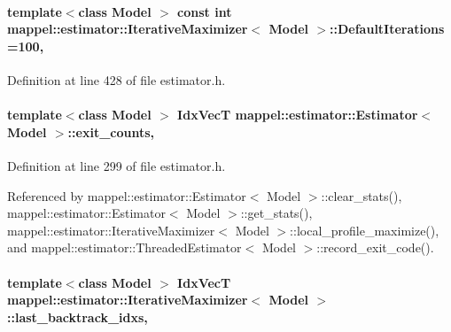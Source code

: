 \paragraph[{\texorpdfstring{Default\+Iterations}{DefaultIterations}}]{\setlength{\rightskip}{0pt plus 5cm}template$<$class Model $>$ const int {\bf mappel\+::estimator\+::\+Iterative\+Maximizer}$<$ Model $>$\+::Default\+Iterations =100\hspace{0.3cm}{\ttfamily [static]}, {\ttfamily [inherited]}}\hypertarget{classmappel_1_1estimator_1_1IterativeMaximizer_ab66c01c2eee630f3fca119f3fe09a19a}{}\label{classmappel_1_1estimator_1_1IterativeMaximizer_ab66c01c2eee630f3fca119f3fe09a19a}


Definition at line 428 of file estimator.\+h.

\paragraph[{\texorpdfstring{exit\+\_\+counts}{exit_counts}}]{\setlength{\rightskip}{0pt plus 5cm}template$<$class Model $>$ {\bf Idx\+VecT} {\bf mappel\+::estimator\+::\+Estimator}$<$ Model $>$\+::exit\+\_\+counts\hspace{0.3cm}{\ttfamily [protected]}, {\ttfamily [inherited]}}\hypertarget{classmappel_1_1estimator_1_1Estimator_aa946d9789a1299d684f83a822a10caa7}{}\label{classmappel_1_1estimator_1_1Estimator_aa946d9789a1299d684f83a822a10caa7}


Definition at line 299 of file estimator.\+h.



Referenced by mappel\+::estimator\+::\+Estimator$<$ Model $>$\+::clear\+\_\+stats(), mappel\+::estimator\+::\+Estimator$<$ Model $>$\+::get\+\_\+stats(), mappel\+::estimator\+::\+Iterative\+Maximizer$<$ Model $>$\+::local\+\_\+profile\+\_\+maximize(), and mappel\+::estimator\+::\+Threaded\+Estimator$<$ Model $>$\+::record\+\_\+exit\+\_\+code().

\paragraph[{\texorpdfstring{last\+\_\+backtrack\+\_\+idxs}{last_backtrack_idxs}}]{\setlength{\rightskip}{0pt plus 5cm}template$<$class Model $>$ {\bf Idx\+VecT} {\bf mappel\+::estimator\+::\+Iterative\+Maximizer}$<$ Model $>$\+::last\+\_\+backtrack\+\_\+idxs\hspace{0.3cm}{\ttfamily [protected]}, {\ttfamily [inherited]}}\hypertarget{classmappel_1_1estimator_1_1IterativeMaximizer_aae10373b4dc244c435059bbc6b0d9704}{}\label{classmappel_1_1estimator_1_1IterativeMaximizer_aae10373b4dc244c435059bbc6b0d9704}


